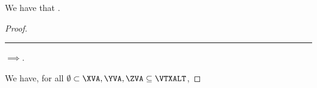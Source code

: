 \begin{proposition}
  We have that \pmapedef.%
\end{proposition}

\begin{proof}
  \hrule
  $\implies$.

  We have, for all $\emptyset \subset \XVA, \YVA, \ZVA \subseteq \VTXALT$,
\end{proof}
